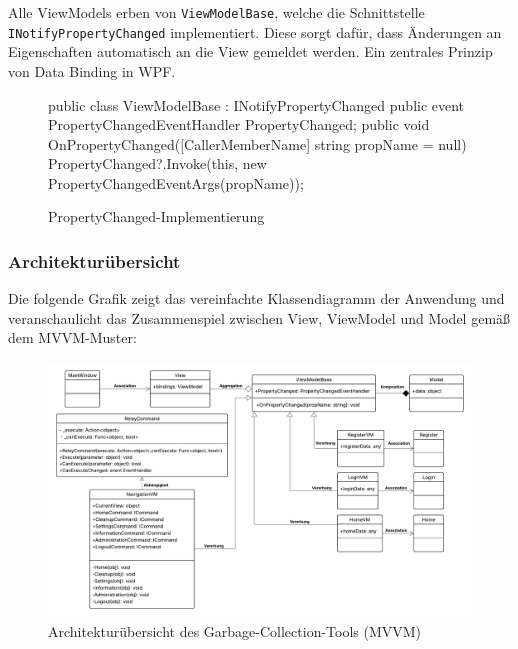 Alle ViewModels erben von \texttt{ViewModelBase}, welche die Schnittstelle \texttt{INotifyPropertyChanged} implementiert. Diese sorgt dafür, dass Änderungen an Eigenschaften automatisch an die View gemeldet werden. Ein zentrales Prinzip von Data Binding in WPF.

\begin{figure}[H]
    \centering
    \begin{cs}
public class ViewModelBase : INotifyPropertyChanged
{
    public event PropertyChangedEventHandler PropertyChanged;
    public void OnPropertyChanged([CallerMemberName] string propName = null)
    {
        PropertyChanged?.Invoke(this, new PropertyChangedEventArgs(propName));
    }
}
\end{cs}
    \caption{PropertyChanged-Implementierung}
\end{figure}

\subsubsection*{Architekturübersicht}

Die folgende Grafik zeigt das vereinfachte Klassendiagramm der Anwendung und veranschaulicht das Zusammenspiel zwischen View, ViewModel und Model gemäß dem MVVM-Muster:

\begin{figure}[H]
    \centering
    \includegraphics[width=1\textwidth]{src/klassen_diagramm.pdf}
    \caption{Architekturübersicht des Garbage-Collection-Tools (MVVM)}
\end{figure}

